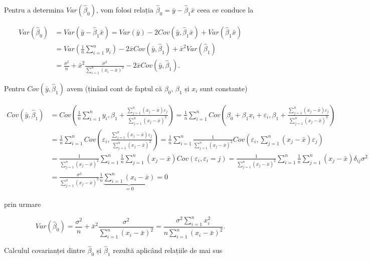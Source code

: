 \documentclass[]{article}
\begin{document}
Pentru a determina \(Var(\hat \beta_0)\), vom folosi relația
\(\hat \beta_0 = \bar y - \hat \beta_1 \bar x\) ceea ce conduce la

\begin{align*}
Var(\hat \beta_0) &= Var(\bar y - \hat \beta_1 \bar x) = Var(\bar y) - 2Cov(\bar y, \hat \beta_1 \bar x) + Var(\hat \beta_1 \bar x)\\
&= Var\left(\frac{1}{n}\sum_{i = 1}^{n}y_i\right) - 2\bar x Cov(\bar y, \hat \beta_1) + \bar x^2 Var(\hat \beta_1)\\
&= \frac{\sigma^2}{n} + \bar x^2 \frac{\sigma^2}{\sum_{i = 1}^{n}(x_i - \bar x)^2} - 2\bar x Cov(\bar y, \hat \beta_1).
\end{align*}

Pentru \(Cov(\bar y, \hat \beta_1)\) avem (ținând cont de faptul că
\(\beta_0\), \(\beta_1\) și \(x_i\) sunt constante)

\begin{align*}
Cov(\bar y, \hat \beta_1) &= Cov\left(\frac{1}{n}\sum_{i = 1}^{n}y_i, \beta_1 + \frac{\sum_{j = 1}^{n}(x_j - \bar x)\varepsilon_j}{\sum_{j = 1}^{n}(x_j - \bar x)^2} \right) = \frac{1}{n}\sum_{i = 1}^{n}Cov\left(\beta_0 + \beta_1 x_i + \varepsilon_i, \beta_1 + \frac{\sum_{j = 1}^{n}(x_j - \bar x)\varepsilon_j}{\sum_{j = 1}^{n}(x_j - \bar x)^2}\right)\\
&= \frac{1}{n}\sum_{i = 1}^{n}Cov\left(\varepsilon_i, \frac{\sum_{j = 1}^{n}(x_j - \bar x)\varepsilon_j}{\sum_{j = 1}^{n}(x_j - \bar x)^2}\right) = \frac{1}{n}\sum_{i = 1}^{n}\frac{1}{\sum_{j = 1}^{n}(x_j - \bar x)^2}Cov\left(\varepsilon_i, \sum_{j = 1}^{n}(x_j - \bar x)\varepsilon_j\right)\\
&= \frac{1}{\sum_{j = 1}^{n}(x_j - \bar x)^2}\sum_{i = 1}^{n}\frac{1}{n}\sum_{j = 1}^{n}(x_j - \bar x)Cov(\varepsilon_i, \varepsilon_i=j) = \frac{1}{\sum_{j = 1}^{n}(x_j - \bar x)^2}\sum_{i = 1}^{n}\frac{1}{n}\sum_{j = 1}^{n}(x_j - \bar x)\delta_{ij}\sigma^2\\
&= \frac{\sigma^2}{\sum_{j = 1}^{n}(x_j - \bar x)^2}\frac{1}{n}\underbrace{\sum_{i = 1}^{n}(x_i - \bar x)}_{=0} = 0
\end{align*}

prin urmare

\[
Var(\hat \beta_0) = \frac{\sigma^2}{n} + \bar x^2 \frac{\sigma^2}{\sum_{i = 1}^{n}(x_i - \bar x)^2} = \frac{\sigma^2\sum_{i = 1}^{n}x_i^2}{n\sum_{i = 1}^{n}(x_i - \bar x)^2}.
\]

Calculul covarianței dintre \(\hat \beta_0\) și \(\hat \beta_1\) rezultă
aplicând relațiile de mai sus
\end{document}
